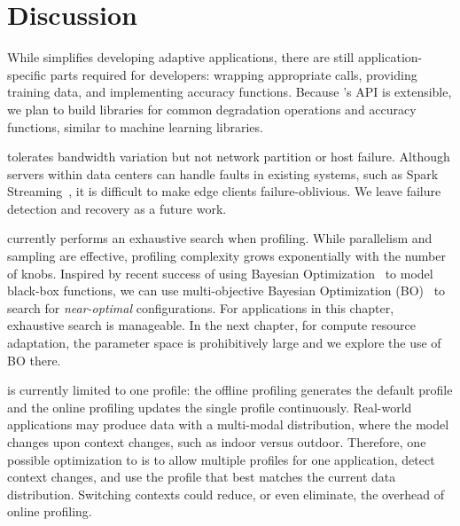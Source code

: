 \section{Discussion}
\label{sec:awstream-discussion}

 While \awstream{} simplifies developing
adaptive applications, there are still application-specific parts required for
developers: wrapping appropriate \maybe{} calls, providing training data, and
implementing accuracy functions. Because \awstream{}'s API is extensible, we plan
to build libraries for common degradation operations and accuracy functions,
similar to machine learning libraries.

 \awstream{} tolerates bandwidth variation
but not network partition or host failure. Although servers within data centers
can handle faults in existing systems, such as Spark
Streaming~\cite{zaharia2013discretized}, it is difficult to make edge clients
failure-oblivious.  We leave failure detection and recovery as a future work.

 \awstream{} currently performs an exhaustive search
when profiling. While parallelism and sampling are effective, profiling
complexity grows exponentially with the number of knobs. Inspired by recent
success of using Bayesian Optimization~\cite{snoek2012practical,
  alipourfard2017cherrypick, solnik2017bayesian} to model black-box functions,
we can use multi-objective Bayesian Optimization
(BO)~\cite{hernandez2016predictive} to search for \textit{near-optimal}
configurations. For applications in this chapter, exhaustive search is
manageable. In the next chapter, for compute resource adaptation, the parameter
space is prohibitively large and we explore the use of BO there.


 \awstream{} is currently limited to one profile: the
offline profiling generates the default profile and the online profiling
updates the single profile continuously.  Real-world applications may produce
data with a multi-modal distribution, where the model changes upon context
changes, such as indoor versus outdoor. Therefore, one possible optimization
to \awstream{} is to allow multiple profiles for one application, detect
context changes, and use the profile that best matches the current data
distribution.  Switching contexts could reduce, or even eliminate, the
overhead of online profiling.

